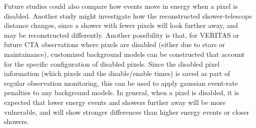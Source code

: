     Future studies could also compare how events move in energy when a pixel is disabled.
    Another study might investigate how the reconstructed shower-telescope distance changes, since a shower with fewer pixels will look further away, and may be reconstructed differently.
    Another possibility is that, for VERITAS or future CTA observations where pixels are disabled (either due to stars or maintainance), customized background models can be constructed that account for the specific configuration of disabled pixels.
    Since the disabled pixel information (which pixels and the disable/enable times) is saved as part of regular observation monitoring, this can be used to apply gaussian event-rate penalties to any background models.
    In general, when a pixel is disabled, it is expected that lower energy events and showers further away will be more vulnerable, and will show stronger differences than higher energy events or closer showers.


